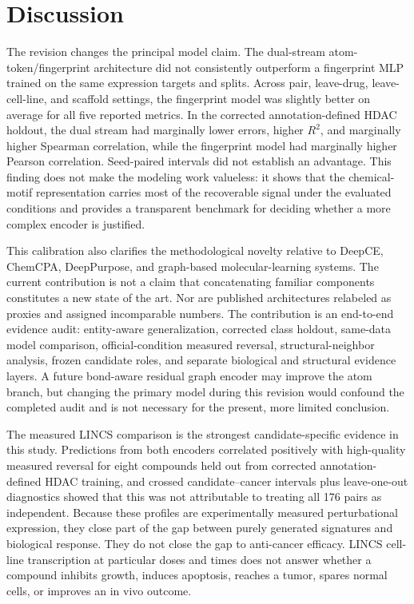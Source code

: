 \section{Discussion}

The revision changes the principal model claim. The dual-stream atom-token/fingerprint architecture did not consistently outperform a fingerprint MLP trained on the same expression targets and splits. Across pair, leave-drug, leave-cell-line, and scaffold settings, the fingerprint model was slightly better on average for all five reported metrics. In the corrected annotation-defined HDAC holdout, the dual stream had marginally lower errors, higher $R^2$, and marginally higher Spearman correlation, while the fingerprint model had marginally higher Pearson correlation. Seed-paired intervals did not establish an advantage. This finding does not make the modeling work valueless: it shows that the chemical-motif representation carries most of the recoverable signal under the evaluated conditions and provides a transparent benchmark for deciding whether a more complex encoder is justified.

This calibration also clarifies the methodological novelty relative to DeepCE, ChemCPA, DeepPurpose, and graph-based molecular-learning systems. The current contribution is not a claim that concatenating familiar components constitutes a new state of the art. Nor are published architectures relabeled as proxies and assigned incomparable numbers. The contribution is an end-to-end evidence audit: entity-aware generalization, corrected class holdout, same-data model comparison, official-condition measured reversal, structural-neighbor analysis, frozen candidate roles, and separate biological and structural evidence layers. A future bond-aware residual graph encoder may improve the atom branch, but changing the primary model during this revision would confound the completed audit and is not necessary for the present, more limited conclusion.

The measured LINCS comparison is the strongest candidate-specific evidence in this study. Predictions from both encoders correlated positively with high-quality measured reversal for eight compounds held out from corrected annotation-defined HDAC training, and crossed candidate--cancer intervals plus leave-one-out diagnostics showed that this was not attributable to treating all 176 pairs as independent. Because these profiles are experimentally measured perturbational expression, they close part of the gap between purely generated signatures and biological response. They do not close the gap to anti-cancer efficacy. LINCS cell-line transcription at particular doses and times does not answer whether a compound inhibits growth, induces apoptosis, reaches a tumor, spares normal cells, or improves an in vivo outcome.

